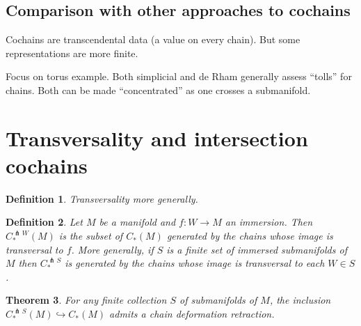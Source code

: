 \documentclass{amsart}          %
\newtheorem{theorem}{Theorem}
\newtheorem{definition}[theorem]{Definition}
\begin{document}
\subsection{Comparison with other approaches to cochains}

Cochains are transcendental data (a value on every chain).  But some representations are more finite.

Focus on torus example.  Both simplicial and de Rham  generally assess ``tolls'' for chains.  Both can be made ``concentrated'' as one
crosses a submanifold.  


\section{Transversality and intersection cochains}

\begin{definition}
Transversality more generally.
\end{definition}

\begin{definition}
Let $M$ be a manifold and $f : W \to M$ an immersion. Then $C^{\pitchfork W}_{*}(M)$ is the subset of $C_{*}(M)$ generated by the chains whose image is transversal to $f$. More generally, if $S$ is a  finite set of immersed submanifolds of $M$ then $C^{\pitchfork S}_{*}$ is generated by the chains whose image is transversal to each $W \in S$.
\end{definition}

\begin{theorem}\label{T:qi}
For any finite collection $S$ of submanifolds of $M$, the inclusion $C^{\pitchfork S}_{*}(M) \hookrightarrow C_{*}(M)$ admits a chain deformation retraction.
\end{theorem}
\end{document}
